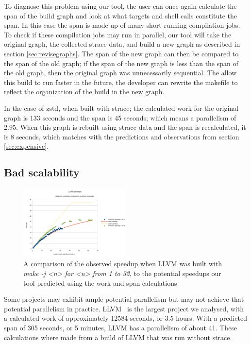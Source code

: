 \documentclass[sigconf,10pt,review,authorversion]{acmart}\settopmatter{printfolios=true,printccs=false,printacmref=false}
\begin{document}
To diagnose this problem using our tool, the user can once again calculate the span of the build
graph and look at what targets and shell calls constitute the span.  In this case the span is
made up of many short running compilation jobs.  To check if these compilation jobs may run in
parallel, our tool will take the original graph, the collected strace data, and build a new graph
as described in section \ref{sec:revisegraphs}.  The span of the new graph can then be compared
to the span of the old graph; if the span of the new graph is less than the span of the old graph,
then the original graph was unnecessarily sequential.  The allow this build to run faster in the
future, the developer can rewrite the makefile to reflect the organization of the build in
the new graph.

In the case of zstd, when built with strace; the calculated work for the original graph is 133
seconds and the span is 45 seconds; which means a parallelism of 2.95.  When this graph is
rebuilt using strace data and the span is recalculated, it is 8 seconds, which matches with the
predictions and observations from section \ref{sec:expensive}.

\subsection{Bad scalability}
\label{sec:scalability}

\begin{figure}[t]
  \includegraphics[width=0.5\textwidth]{llvm-speedup-w-64}
  \caption{A comparison of the observed speedup when LLVM was built with \emph{make -j <n> for <n> from 1 to 32},
    to the potential speedups our tool predicted using the work and span calculations}
  \label{fig:llvm}
\end{figure}

Some projects may exhibit ample potential parallelism but may not achieve that potential
parallelism in practice.  LLVM~\citep{LLVM:CGO04} is the largest
project we analysed, with a calculated work of approximately 12584 seconds, or 3.5 hours.
With a predicted span of 305 seconds, or 5 minutes, LLVM has a parallelism of about 41.
These calculations where made from a build of LLVM that was run without strace.
\end{document}

